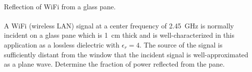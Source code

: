 ~\\ \begin{example} 
\label{m0162_exWiFi}
\begin{mdframed}[backgroundcolor=brown!20,linecolor=brown!20]\raggedright
Reflection of WiFi from a glass pane.
\\~\\
A WiFi (wireless LAN) signal at a center frequency of 2.45~GHz is normally incident on a glass pane which is 1~cm thick and is well-characterized in this application as a lossless dielectric with $\epsilon_r=4$.
The source of the signal is sufficiently distant from the window that the incident signal is well-approximated as a plane wave.
Determine the fraction of power reflected from the pane.\\
~\\


\end{mdframed}
\end{example}
